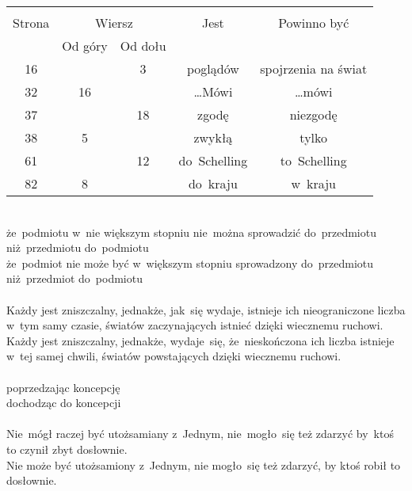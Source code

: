 \documentclass[a4paper,11pt]{article}
\begin{document}


\begin{center}

  \begin{tabular}{|c|c|c|c|c|}
    \hline
    & \multicolumn{2}{c|}{} & & \\
    Strona & \multicolumn{2}{c|}{Wiersz} & Jest
                              & Powinno być \\ \cline{2-3}
    & Od góry & Od dołu & & \\
    \hline
    16  & &  3 & poglądów & spojrzenia na świat \\
    32  & 16 & & \ldots Mówi & \ldots mówi \\
    37  & & 18 & zgodę & niezgodę \\
    38  &  5 & & zwykłą & tylko \\
    61 & & 12 & do~Schelling & to~Schelling \\
    82 &  8 & & do~kraju & w~kraju \\
    \hline
  \end{tabular}

\end{center}


\noindent
{} \\
\Jest  że~podmiotu w~nie większym stopniu nie~można sprowadzić
do~przedmiotu niż~przedmiotu do~podmiotu \\
\Powin że~podmiot nie może być w~większym stopniu sprowadzony
do~przedmiotu niż~przedmiot do~podmiotu \\
 \\
\Jest  Każdy jest zniszczalny, jednakże, jak~się wydaje, istnieje ich
nieograniczone liczba w~tym samy czasie, światów zaczynających istnieć
dzięki wiecznemu ruchowi. \\
\Powin Każdy jest zniszczalny, jednakże, wydaje~się, że~nieskończona ich
liczba istnieje w~tej samej chwili, światów powstających dzięki
wiecznemu ruchowi. \\
 \\
\Jest  poprzedzając koncepcję \\
\Powin dochodząc do koncepcji \\
 \\
\Jest  Nie~mógł raczej być utożsamiany z~Jednym, nie~mogło~się też
zdarzyć by~ktoś to czynił zbyt dosłownie. \\
\Powin Nie może być utożsamiony z~Jednym, nie mogło~się też zdarzyć, by
ktoś robił to dosłownie.
\end{document}
